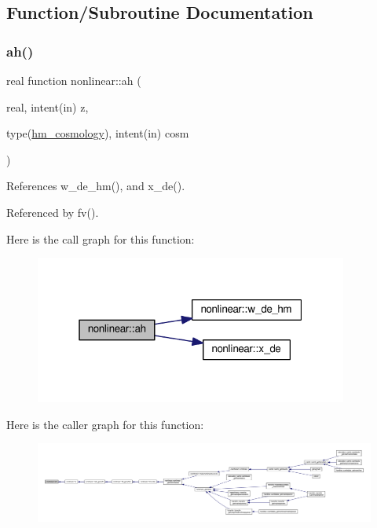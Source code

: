 \subsection{Function/\+Subroutine Documentation}
\mbox{\label{namespacenonlinear_ab5e5d4cd8639004a33671b83480474cd}} 
\subsubsection{\texorpdfstring{ah()}{ah()}}
{\footnotesize\ttfamily real function nonlinear\+::ah (\begin{DoxyParamCaption}\item[{real, intent(in)}]{z,  }\item[{type(\mbox{\hyperlink{structnonlinear_1_1hm__cosmology}{hm\+\_\+cosmology}}), intent(in)}]{cosm }\end{DoxyParamCaption})\hspace{0.3cm}{\ttfamily [private]}}



References w\+\_\+de\+\_\+hm(), and x\+\_\+de().



Referenced by fv().

Here is the call graph for this function\+:
\nopagebreak
\begin{figure}[H]
\begin{center}
\leavevmode
\includegraphics[width=292pt]{namespacenonlinear_ab5e5d4cd8639004a33671b83480474cd_cgraph}
\end{center}
\end{figure}
Here is the caller graph for this function\+:
\nopagebreak
\begin{figure}[H]
\begin{center}
\leavevmode
\includegraphics[width=350pt]{namespacenonlinear_ab5e5d4cd8639004a33671b83480474cd_icgraph}
\end{center}
\end{figure}
\mbox{\label{namespacenonlinear_ac9ae18bd4ed466f0f8287e5c4757bec9}} 
